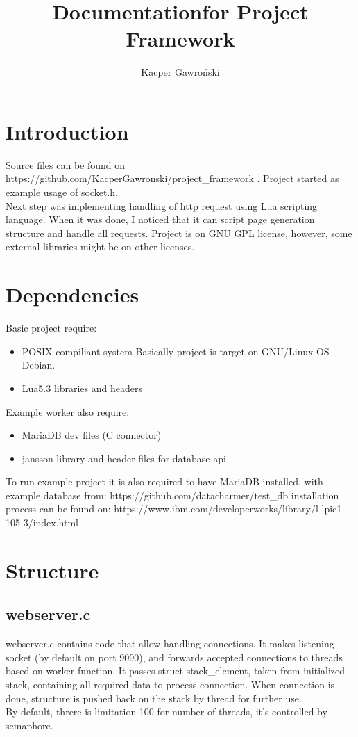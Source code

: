 \documentclass[a4paper]{article}
\title{Documentation\newline for Project Framework}
\author{Kacper Gawroński}
\begin{document}
\maketitle
\section{Introduction}
Source files can be found on https://github.com/KacperGawronski/project\_framework .\newline
Project started as example usage of socket.h.\\
Next step was implementing handling of http request using Lua scripting
language. When it was done, I noticed that it can script page generation
structure and handle all requests. Project is on GNU GPL license, 
however, some external libraries might be on other licenses.
\section{Dependencies}
Basic project require:\\
\begin{itemize}
\item{POSIX compiliant system} Basically project is target on GNU/Linux
OS - Debian.
\item{Lua5.3 libraries and headers}
\end{itemize}
Example worker also require:
\begin{itemize}
\item{MariaDB dev files (C connector)}
\item{jansson library and header files} for database api
\end{itemize}
To run example project it is also required to have MariaDB installed,
with example database from:\newline
https://github.com/datacharmer/test\_db\newline
installation process can be found on:\newline
https://www.ibm.com/developerworks/library/l-lpic1-105-3/index.html
\newpage
\section{Structure}
\subsection{webserver.c}
webserver.c contains code that allow handling connections.
It makes listening socket (by default on port 9090), and forwards
accepted connections to threads based on worker function. It passes
struct stack\_element, taken from initialized stack, containing all
required data to process connection. When connection is done, structure
is pushed back on the stack by thread for further use.\\
By default, threre is limitation 100 for number of threads, it's
controlled by semaphore.
\end{document}
